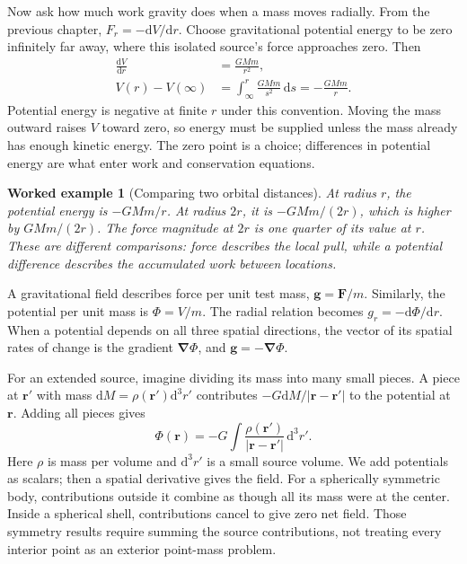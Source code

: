 \documentclass[11pt,oneside]{book}
\newcommand{\dd}{\mathrm{d}}
\newcommand{\vect}[1]{\boldsymbol{#1}}
\newcommand{\grad}{\boldsymbol{\nabla}}
\newcommand{\od}[2]{\frac{\dd #1}{\dd #2}}
\theoremstyle{reviewstyle}
\newtheorem{example}{Worked example}[chapter]
\begin{document}
Now ask how much work gravity does when a mass moves radially. From the previous chapter, $F_r=-\dd V/\dd r$. Choose gravitational potential energy to be zero infinitely far away, where this isolated source's force approaches zero. Then
\begin{align}
\od{V}{r}&=\frac{GMm}{r^2},\\
V(r)-V(\infty)&=\int_\infty^r\frac{GMm}{s^2}\,\dd s
=-\frac{GMm}{r}.
\end{align}
Potential energy is negative at finite $r$ under this convention. Moving the mass outward raises $V$ toward zero, so energy must be supplied unless the mass already has enough kinetic energy. The zero point is a choice; differences in potential energy are what enter work and conservation equations.

\begin{example}[Comparing two orbital distances]
At radius $r$, the potential energy is $-GMm/r$. At radius $2r$, it is $-GMm/(2r)$, which is higher by $GMm/(2r)$. The force magnitude at $2r$ is one quarter of its value at $r$. These are different comparisons: force describes the local pull, while a potential difference describes the accumulated work between locations.
\end{example}

A gravitational field describes force per unit test mass, $\vect g=\vect F/m$. Similarly, the potential per unit mass is $\Phi=V/m$. The radial relation becomes $g_r=-\dd\Phi/\dd r$. When a potential depends on all three spatial directions, the vector of its spatial rates of change is the gradient $\grad\Phi$, and $\vect g=-\grad\Phi$.

For an extended source, imagine dividing its mass into many small pieces. A piece at $\vect r'$ with mass $\dd M=\rho(\vect r')\dd^3r'$ contributes $-G\dd M/|\vect r-\vect r'|$ to the potential at $\vect r$. Adding all pieces gives
\begin{equation}
\Phi(\vect r)=-G\int\frac{\rho(\vect r')}{|\vect r-\vect r'|}\,\dd^3r'.
\end{equation}
Here $\rho$ is mass per volume and $\dd^3r'$ is a small source volume. We add potentials as scalars; then a spatial derivative gives the field. For a spherically symmetric body, contributions outside it combine as though all its mass were at the center. Inside a spherical shell, contributions cancel to give zero net field. Those symmetry results require summing the source contributions, not treating every interior point as an exterior point-mass problem.
\end{document}
